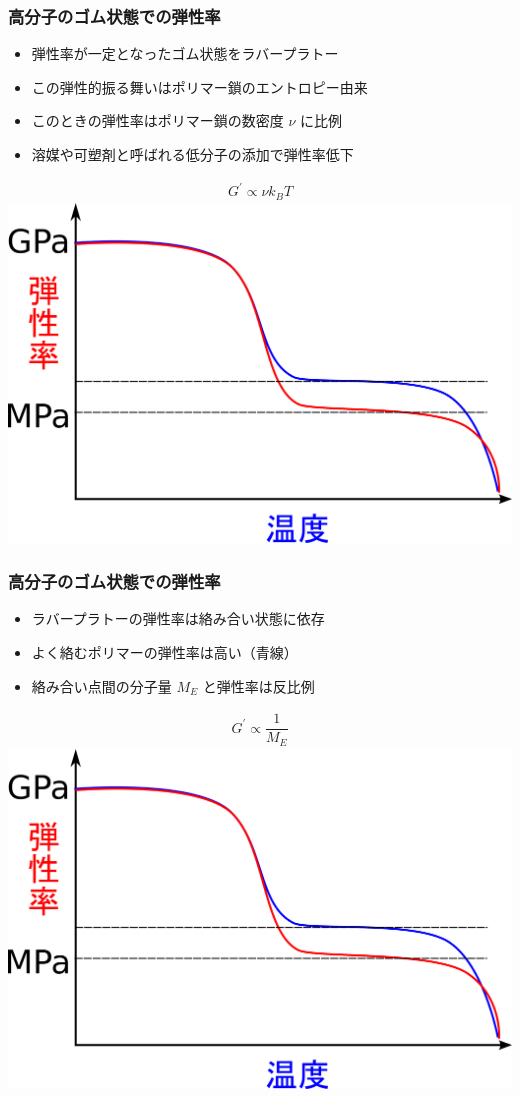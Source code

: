 \documentclass[unicode,12pt]{beamer}%
\begin{document}
\begin{frame}
	\frametitle{高分子のゴム状態での弾性率}
				\begin{itemize}
					\item 弾性率が一定となったゴム状態をラバープラトー
					\item この弾性的振る舞いはポリマー鎖のエントロピー由来
					\item このときの弾性率は\alert{ポリマー鎖の数密度 $\nu$ に比例}
					\item 溶媒や可塑剤と呼ばれる\alert{低分子の添加で弾性率低下}
				\end{itemize}
				\vspace{-.5\baselineskip}
					\begin{align*}
						G^{\prime} \propto \nu k_B T
					\end{align*}
				\centering
						\includegraphics[width=.5\textwidth]{polymer_spectrum_rubber.png}
\end{frame}

\begin{frame}
	\frametitle{高分子のゴム状態での弾性率}
				\begin{itemize}
					\item ラバープラトーの弾性率は絡み合い状態に依存
					\item よく絡むポリマーの弾性率は高い（青線）
					\item 絡み合い点間の分子量 \alert{$M_E$ と弾性率は反比例}
				\end{itemize}
				\vspace{-.5\baselineskip}
					\begin{align*}
						G^{\prime} \propto \dfrac{1}{M_E}
					\end{align*}
				\centering
						\includegraphics[width=.5\textwidth]{polymer_spectrum_rubber.png}
\end{frame}
\end{document}
